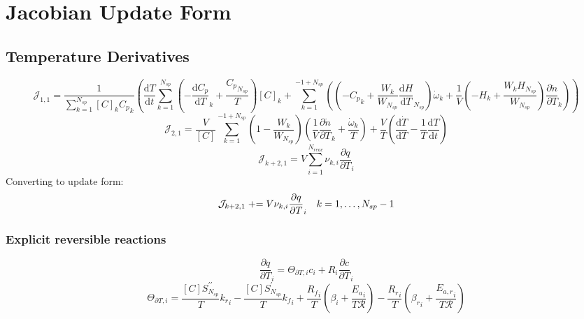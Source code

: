 \documentclass[a4paper,10pt]{article}
\newcommand{\pluseq}{\mathrel{{+}{=}}}
\newcommand{\ns}{N_{sp}}
\newcommand{\nr}{N_{reac}}
\newcommand{\Ru}{\mathcal{R}}
\begin{document}
\section{Jacobian Update Form}
\subsection{Temperature Derivatives}
\begin{dmath} \mathcal{J}_{1,1} = \frac{1}{\sum_{k=1}^{\ns} [C]_{k} {C_p}_{k}} \left(\frac{\text{d} T }{\text{d} t } \sum_{k=1}^{\ns} \left(- \frac{\text{d} {C_p} }{\text{d} T }_{k} + \frac{{C_p}_{\ns}}{T}\right) [C]_{k} + \sum_{k=1}^{-1 + \ns} \left(\left(- {C_p}_{k} + \frac{W_{k}}{W_{\ns}} \frac{\text{d} H }{\text{d} T }_{\ns}\right) \dot{\omega}_{k} + \frac{1}{V} \left(- H_{k} + \frac{W_{k} H_{\ns}}{W_{\ns}}\right) \frac{\partial \dot{n} }{\partial T }_{k}\right)\right)\end{dmath} 
\begin{dmath} \mathcal{J}_{2,1} = \frac{V}{[C]} \sum_{k=1}^{-1 + \ns} \left(1 - \frac{W_{k}}{W_{\ns}}\right) \left(\frac{1}{V} \frac{\partial \dot{n} }{\partial T }_{k} + \frac{\dot{\omega}_{k}}{T}\right) + \frac{V}{T} \left(\frac{\text{d} \dot{T} }{\text{d} T } - \frac{1}{T} \frac{\text{d} T }{\text{d} t }\right)\end{dmath} 
\begin{dmath} \mathcal{J}_{k + 2,1} = V \sum_{i=1}^{\nr} \nu_{k,i} \frac{\partial q }{\partial T }_{i}\end{dmath} 
Converting to update form:
\begin{dmath} \mathcal{J}_{k + 2,1}\pluseq V \nu_{k,i} \frac{\partial q }{\partial T }_{i}\text{\quad} k = 1, \ldots, N_{sp} - 1\end{dmath} 
\subsubsection{Explicit reversible reactions}
\begin{dmath} \frac{\partial q }{\partial T }_{i} = \Theta_{\partial T, i} c_{i} + R_{i} \frac{\partial c }{\partial T }_{i}\end{dmath} 
\begin{dmath} \Theta_{\partial T, i} = \frac{[C] S^{\prime\prime}_{\ns}}{T} {k_r}_{i} - \frac{[C] S^{\prime}_{\ns}}{T} {k_f}_{i} + \frac{{R_f}_{i}}{T} \left(\beta_{i} + \frac{{E_{a}}_{i}}{T \Ru}\right) - \frac{{R_r}_{i}}{T} \left({\beta_r}_{i} + \frac{{E_{a,r}}_{i}}{T \Ru}\right)\end{dmath} 
\end{document}
